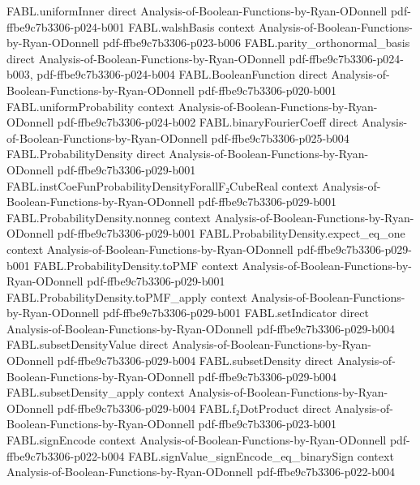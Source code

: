\begin{theorem}
\proofstep
  {FABL.uniformInner}
  {direct}
  {Analysis-of-Boolean-Functions-by-Ryan-ODonnell}
  {pdf-ffbe9c7b3306-p024-b001}
\proofstep
  {FABL.walshBasis}
  {context}
  {Analysis-of-Boolean-Functions-by-Ryan-ODonnell}
  {pdf-ffbe9c7b3306-p023-b006}
\proofstep
  {FABL.parity_orthonormal_basis}
  {direct}
  {Analysis-of-Boolean-Functions-by-Ryan-ODonnell}
  {pdf-ffbe9c7b3306-p024-b003,
    pdf-ffbe9c7b3306-p024-b004}
\proofstep
  {FABL.BooleanFunction}
  {direct}
  {Analysis-of-Boolean-Functions-by-Ryan-ODonnell}
  {pdf-ffbe9c7b3306-p020-b001}
\proofstep
  {FABL.uniformProbability}
  {context}
  {Analysis-of-Boolean-Functions-by-Ryan-ODonnell}
  {pdf-ffbe9c7b3306-p024-b002}
\proofstep
  {FABL.binaryFourierCoeff}
  {direct}
  {Analysis-of-Boolean-Functions-by-Ryan-ODonnell}
  {pdf-ffbe9c7b3306-p025-b004}
\proofstep
  {FABL.ProbabilityDensity}
  {direct}
  {Analysis-of-Boolean-Functions-by-Ryan-ODonnell}
  {pdf-ffbe9c7b3306-p029-b001}
\proofstep
  {FABL.instCoeFunProbabilityDensityForallF₂CubeReal}
  {context}
  {Analysis-of-Boolean-Functions-by-Ryan-ODonnell}
  {pdf-ffbe9c7b3306-p029-b001}
\proofstep
  {FABL.ProbabilityDensity.nonneg}
  {context}
  {Analysis-of-Boolean-Functions-by-Ryan-ODonnell}
  {pdf-ffbe9c7b3306-p029-b001}
\proofstep
  {FABL.ProbabilityDensity.expect_eq_one}
  {context}
  {Analysis-of-Boolean-Functions-by-Ryan-ODonnell}
  {pdf-ffbe9c7b3306-p029-b001}
\proofstep
  {FABL.ProbabilityDensity.toPMF}
  {context}
  {Analysis-of-Boolean-Functions-by-Ryan-ODonnell}
  {pdf-ffbe9c7b3306-p029-b001}
\proofstep
  {FABL.ProbabilityDensity.toPMF_apply}
  {context}
  {Analysis-of-Boolean-Functions-by-Ryan-ODonnell}
  {pdf-ffbe9c7b3306-p029-b001}
\proofstep
  {FABL.setIndicator}
  {direct}
  {Analysis-of-Boolean-Functions-by-Ryan-ODonnell}
  {pdf-ffbe9c7b3306-p029-b004}
\proofstep
  {FABL.subsetDensityValue}
  {direct}
  {Analysis-of-Boolean-Functions-by-Ryan-ODonnell}
  {pdf-ffbe9c7b3306-p029-b004}
\proofstep
  {FABL.subsetDensity}
  {direct}
  {Analysis-of-Boolean-Functions-by-Ryan-ODonnell}
  {pdf-ffbe9c7b3306-p029-b004}
\proofstep
  {FABL.subsetDensity_apply}
  {context}
  {Analysis-of-Boolean-Functions-by-Ryan-ODonnell}
  {pdf-ffbe9c7b3306-p029-b004}
\proofstep
  {FABL.f₂DotProduct}
  {direct}
  {Analysis-of-Boolean-Functions-by-Ryan-ODonnell}
  {pdf-ffbe9c7b3306-p023-b001}
\proofstep
  {FABL.signEncode}
  {context}
  {Analysis-of-Boolean-Functions-by-Ryan-ODonnell}
  {pdf-ffbe9c7b3306-p022-b004}
\proofstep
  {FABL.signValue_signEncode_eq_binarySign}
  {context}
  {Analysis-of-Boolean-Functions-by-Ryan-ODonnell}
  {pdf-ffbe9c7b3306-p022-b004}
\proofstep

\end{theorem}
